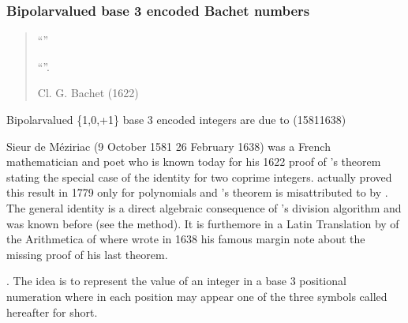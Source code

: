 \documentclass[a4paper,12pt,english]{sphinxhowto}
\begin{document}
\subsubsection{Bipolar\sphinxhyphen{}valued base 3 encoded Bachet numbers}
\label{\detokenize{pearls:bipolar-valued-base-3-encoded-bachet-numbers}}\begin{quote}

\sphinxAtStartPar
“” %
\begin{footnote}[24]\sphinxAtStartFootnote
“”.
%
\end{footnote}
\textendash{} Cl. G. Bachet (1622) 
\end{quote}

\sphinxAtStartPar
Bipolar\sphinxhyphen{}valued \{\sphinxhyphen{}1,0,+1\} base 3 encoded integers are due to  (1581\sphinxhyphen{}1638) %
\begin{footnote}[20]\sphinxAtStartFootnote
{}  Sieur de Méziriac (9 October 1581 \textendash{} 26 February 1638) was a French mathematician and poet who is known today for his 1622 proof of ’s theorem stating the special case of the  identity for two coprime integers.  actually proved this result in 1779 only for polynomials and ’s theorem is misattributed to  by . The general  identity is a direct algebraic consequence of ’s division algorithm and was known before  (see the  method). It is furthemore in a Latin Translation by  of the Arithmetica of  where  wrote in 1638 his famous margin note about the missing proof of his last theorem.
%
\end{footnote}. The idea is to represent the value of an integer  in a base 3 positional numeration where in each position may appear one of the three symbols  called hereafter  for short.
\end{document}
